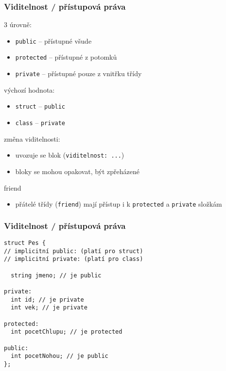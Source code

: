 
\begin{frame}[fragile]
\frametitle{Viditelnost / přístupová práva}

\begin{bitemize}
\item 3 úrovně:
\begin{itemize}
\item \lstinline|public| -- přístupné všude
\item \lstinline|protected| -- přístupné z potomků
\item \lstinline|private| -- přístupné pouze z vnitřku třídy
\end{itemize}
\item výchozí hodnota:
\begin{itemize}
\item \lstinline|struct| -- \lstinline|public|
\item \lstinline|class| -- \lstinline|private|
\end{itemize}

\item změna viditelnosti:
\begin{itemize}
\item uvozuje se blok (\lstinline|viditelnost: ...|)
\item bloky se mohou opakovat, být zpřeházené
\end{itemize}
\end{bitemize}

\begin{bonusblock}{friend}
\begin{itemize}
\item přátelé třídy (\lstinline|friend|) mají přístup i k \lstinline|protected| a \lstinline|private| složkám
\end{itemize}
\end{bonusblock}
\end{frame}


\begin{frame}[fragile]
\frametitle{Viditelnost / přístupová práva}
\begin{yesblock}
\begin{lstlisting}
struct Pes {
// implicitní public: (platí pro struct)
// implicitní private: (platí pro class)

  string jmeno; // je public

private:
  int id; // je private
  int vek; // je private
 
protected:
  int pocetChlupu; // je protected

public:
  int pocetNohou; // je public
};
\end{lstlisting}
\end{yesblock}
\end{frame}

